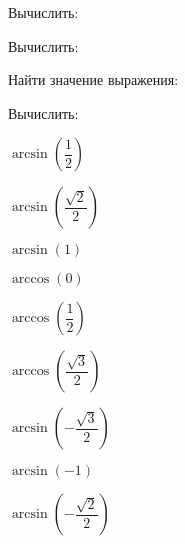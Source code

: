 \begin{listofex}
	\item Вычислить:
	\begin{enumcols}[itemcolumns=3]
		\item {}
		\item {}
		\item {}
		\item {}
		\item {}
		\item {}
	\end{enumcols}
	\item Вычислить:
	\begin{enumcols}[itemcolumns=2]
		\item {}
		\item {}
		\item {}
		\item {}
	\end{enumcols}
	\item Найти значение выражения:
	\begin{enumcols}[itemcolumns=2]
		\item {}
		\item {}
	\end{enumcols}
	\item {}
	\item {}
	\item {}
	\item Вычислить:
	\begin{enumcols}[itemcolumns=3]
		\item \( \arcsin\left( \dfrac{1}{2} \right) \)
		\item \( \arcsin\left( \dfrac{\sqrt{2}}{2} \right) \)
		\item \( \arcsin(1) \)
		\item \( \arccos(0) \)
		\item \( \arccos\left( \dfrac{1}{2} \right) \)
		\item \( \arccos\left( \dfrac{\sqrt{3}}{2} \right) \)
		\item \( \arcsin\left( -\dfrac{\sqrt{3}}{2} \right) \)
		\item \( \arcsin(-1) \)
		\item \( \arcsin\left( -\dfrac{\sqrt{2}}{2} \right) \)
	\end{enumcols}
	\item {}
\end{listofex}